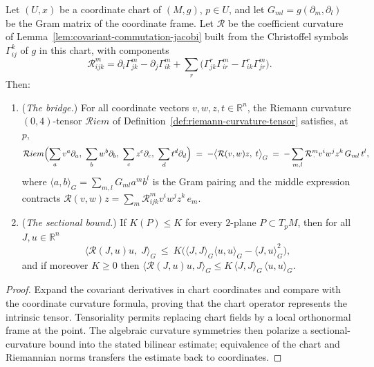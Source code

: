 \begin{lemma}
\label{lem:chart-curvature-coordinates}





Let $(U,x)$ be a coordinate chart of $(M,g)$, $p\in U$, and let
$G_{ml}=g(\partial_m,\partial_l)$ be the Gram matrix of the
coordinate frame. Let ${\mathcal R}$ be the coefficient curvature of
Lemma~\ref{lem:covariant-commutation-jacobi} built from the
Christoffel symbols $\Gamma^k_{ij}$ of $g$ in this chart, with
components
$${\mathcal R}^m_{ijk}
=\partial_i\Gamma^m_{jk}-\partial_j\Gamma^m_{ik}
+\sum_r\bigl(\Gamma^r_{jk}\Gamma^m_{ir}
-\Gamma^r_{ik}\Gamma^m_{jr}\bigr).$$
Then:
\begin{enumerate}
\item ({\em The bridge.}) For all coordinate vectors
$v,w,z,t\in\mathbb{R}^n$, the Riemann curvature $(0,4)$-tensor
${\mathcal R}iem$ of Definition~\ref{def:riemann-curvature-tensor}
satisfies, at $p$,
$${\mathcal R}iem\Bigl(\sum_a v^a\partial_a,\ \sum_b w^b\partial_b,\
\sum_c z^c\partial_c,\ \sum_d t^d\partial_d\Bigr)
\;=\;-\bigl\langle{\mathcal R}(v,w)z,\;t\bigr\rangle_G
\;=\;-\sum_{m,l}{\mathcal R}^m_{\,\cdot}v^iw^jz^k\,G_{ml}\,t^l,$$
where $\langle a,b\rangle_G=\sum_{m,l}G_{ml}a^mb^l$ is the Gram
pairing and the middle expression contracts
${\mathcal R}(v,w)z=\sum_m{\mathcal R}^m_{ijk}v^iw^jz^k\,e_m$.
\item ({\em The sectional bound.}) If $K(P)\le K$ for every
$2$-plane $P\subset T_pM$, then for all $J,u\in\mathbb{R}^n$
$$\bigl\langle{\mathcal R}(J,u)u,\;J\bigr\rangle_G\ \le\
K\bigl(\langle J,J\rangle_G\langle u,u\rangle_G
-\langle J,u\rangle_G^2\bigr),$$
and if moreover $K\ge0$ then
$\langle{\mathcal R}(J,u)u,J\rangle_G\le
K\,\langle J,J\rangle_G\,\langle u,u\rangle_G$.
\end{enumerate}
\end{lemma}

\begin{proof}
\sketch

Expand the covariant derivatives in chart coordinates and compare with the coordinate curvature formula, proving that the chart operator represents the intrinsic tensor. Tensoriality permits replacing chart fields by a local orthonormal frame at the point. The algebraic curvature symmetries then polarize a sectional-curvature bound into the stated bilinear estimate; equivalence of the chart and Riemannian norms transfers the estimate back to coordinates.
\end{proof}

